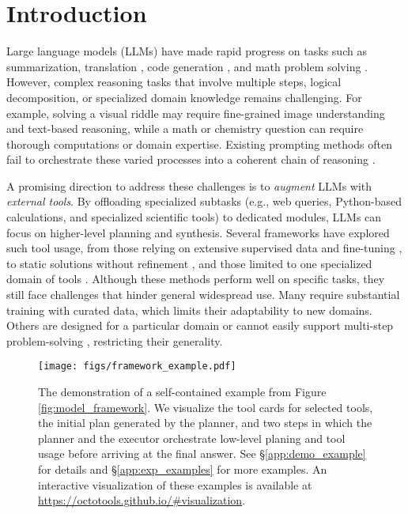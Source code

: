 \section{Introduction}
\label{sec:intro}
Large language models (LLMs) \citep{brown2020language, chowdhery2022palm, openai2023gpt4} have made rapid progress on tasks such as summarization, translation \citep{thoppilan2022lamda}, code generation \citep{nakano2021webgpt}, and math problem solving \citep{shuster2022blenderbot}. However, complex reasoning tasks that involve multiple steps, logical decomposition, or specialized domain knowledge remains challenging. For example, solving a visual riddle may require fine-grained image understanding and text-based reasoning, while a math or chemistry question can require thorough computations or domain expertise. Existing prompting methods often fail to orchestrate these varied processes into a coherent chain of reasoning \citep{yao2022react}. 

A promising direction to address these challenges is to \emph{augment} LLMs with \emph{external tools}. By offloading specialized subtasks (e.g., web queries, Python-based calculations, and specialized scientific tools) to dedicated modules, LLMs can focus on higher-level planning and synthesis. Several frameworks have explored such tool usage, from those relying on extensive supervised data and fine-tuning \citep{schick2023toolformer, liu2023llava}, to static solutions without refinement \citep{lu2023chameleon}, and those limited to one specialized domain of tools \citep{nakano2021webgpt,tao2023webwise,hu2024visual}. Although these methods perform well on specific tasks, they still face challenges that hinder general widespread use. Many require substantial training with curated data, which limits their adaptability to new domains. Others are designed for a particular domain \citep{bran2023chemcrow,kang2024chatmof,li2024mmedagent,schmidgall2024agentclinic} or cannot easily support multi-step problem-solving \citep{lu2023chameleon}, restricting their generality.

\begin{figure*}[th!]
    \centering
    \texttt{[image: figs/framework\_example.pdf]}
    \vspace{-3mm}
    \caption{The demonstration of a self-contained example from Figure \ref{fig:model_framework}. We visualize the tool cards for selected tools, the initial plan generated by the planner, and two steps in which the planner and the executor orchestrate low-level planing and tool usage before arriving at the final answer. See \S\ref{app:demo_example} for details and \S\ref{app:exp_examples} for more examples. An interactive visualization of these examples is available at \url{https://octotools.github.io/\#visualization}.}
\label{fig:model_example}
\end{figure*}

